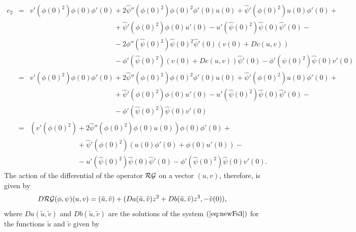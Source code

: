 \begin{eqnarray} \label{eq:matrices}
\nonumber c_2&=&v'(\phi(0)^2) \phi(0) \phi'(0)+2 \hat{\psi}''(\phi(0)^2) \phi(0)^2 \phi'(0) u(0)+\hat{\psi}'(\phi(0)^2) u(0) \phi'(0)+\\
\nonumber &\phantom{=}& \phantom{v'(\phi(0)^2) \phi(0) \phi'(0)}+ \hat{\psi}'(\phi(0)^2) \phi(0) u'(0)-u'(\hat{\psi}(0)^2) \hat{\psi}(0) \hat{\psi}'(0) -\\
\nonumber &\phantom{=}& \phantom{v'(\phi(0)^2) \phi(0) \phi'(0)}-2 \phi''(\hat{\psi}(0)^2) \hat{\psi}(0)^2 \hat{\psi}'(0) (v(0)+ Dc (u,v)) \\
\nonumber &\phantom{=}&\phantom{v'(\phi(0)^2) \phi(0) \phi'(0)}-\phi'(\hat{\psi}(0)^2) (v(0)+ Dc (u,v)) \hat{\psi}'(0)-\phi'(\hat{\psi}(0)^2) \hat{\psi}(0) v'(0) \\
\nonumber &=&v'(\phi(0)^2) \phi(0) \phi'(0)+2 \hat{\psi}''(\phi(0)^2) \phi(0)^2 \phi'(0) u(0)+\hat{\psi}'(\phi(0)^2) u(0) \phi'(0)+ \\
\nonumber &\phantom{=}& \phantom{v'(\phi(0)^2) \phi(0) \phi'(0)} +  \hat{\psi}'(\phi(0)^2) \phi(0) u'(0)-u'(\hat{\psi}(0)^2) \hat{\psi}(0) \hat{\psi}'(0)- \\
\nonumber &\phantom{=}& \phantom{v'(\phi(0)^2) \phi(0) \phi'(0)} - \phi'(\hat{\psi}(0)^2) \hat{\psi}(0) v'(0) \\
\nonumber &=&\left(v'(\phi(0)^2) +2 \hat{\psi}''(\phi(0)^2) \phi(0) u(0) \right)\phi(0) \phi'(0)  + \\
\nonumber  &\phantom{=}&\phantom{\left(v'(\phi(0)^2) \right.}   + \hat{\psi}'(\phi(0)^2) \left(u(0) \phi'(0)+\phi(0) u'(0) \right)-\\
\nonumber  &\phantom{=}&\phantom{\left(v'(\phi(0)^2) \right.}  - u'(\hat{\psi}(0)^2) \hat{\psi}(0) \hat{\psi}'(0)-\phi'(\hat{\psi}(0)^2) \hat{\psi}(0) v'(0).
\end{eqnarray}
The action of the differential of the operator $\mathcal{RG}$ on a vector $(u,v)$, therefore, is given by
$$D \mathcal{RG} (\phi,\psi) (u,v)=(\tilde{u},\tilde{v})+( Da (\tilde{u},\tilde{v}) z^2+Db (\tilde{u},\tilde{v}) z^3, -\tilde{v}(0)),$$
where  $Da (\tilde{u},\tilde{v})$ and  $Db (\tilde{u},\tilde{v})$ are the solutions of the system $(\ref{eq:newFs3})$ for the functions  $\tilde{u}$ and $\tilde{v}$ given by
